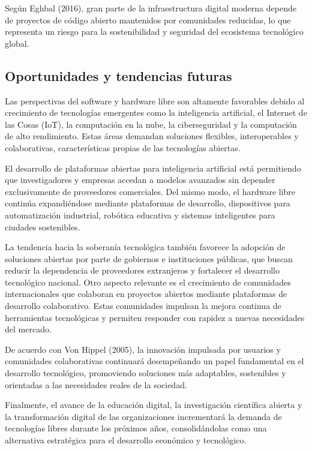 \documentclass[12pt]{article}
\begin{document}
	Según Eghbal (2016), gran parte de la infraestructura digital moderna depende de proyectos de código abierto mantenidos por comunidades reducidas, lo que representa un riesgo para la sostenibilidad y seguridad del ecosistema tecnológico global.
	\subsection{Oportunidades y tendencias futuras}
	
	Las perspectivas del software y hardware libre son altamente favorables debido al crecimiento de tecnologías emergentes como la inteligencia artificial, el Internet de las Cosas (IoT), la computación en la nube, la ciberseguridad y la computación de alto rendimiento. Estas áreas demandan soluciones flexibles, interoperables y colaborativas, características propias de las tecnologías abiertas.
	
	El desarrollo de plataformas abiertas para inteligencia artificial está permitiendo que investigadores y empresas accedan a modelos avanzados sin depender exclusivamente de proveedores comerciales. Del mismo modo, el hardware libre continúa expandiéndose mediante plataformas de desarrollo, dispositivos para automatización industrial, robótica educativa y sistemas inteligentes para ciudades sostenibles.
	
	La tendencia hacia la soberanía tecnológica también favorece la adopción de soluciones abiertas por parte de gobiernos e instituciones públicas, que buscan reducir la dependencia de proveedores extranjeros y fortalecer el desarrollo tecnológico nacional.
	Otro aspecto relevante es el crecimiento de comunidades internacionales que colaboran en proyectos abiertos mediante plataformas de desarrollo colaborativo. Estas comunidades impulsan la mejora continua de herramientas tecnológicas y permiten responder con rapidez a nuevas necesidades del mercado.
	
	De acuerdo con Von Hippel (2005), la innovación impulsada por usuarios y comunidades colaborativas continuará desempeñando un papel fundamental en el desarrollo tecnológico, promoviendo soluciones más adaptables, sostenibles y orientadas a las necesidades reales de la sociedad.
	
	Finalmente, el avance de la educación digital, la investigación científica abierta y la transformación digital de las organizaciones incrementará la demanda de tecnologías libres durante los próximos años, consolidándolas como una alternativa estratégica para el desarrollo económico y tecnológico.
\end{document}
